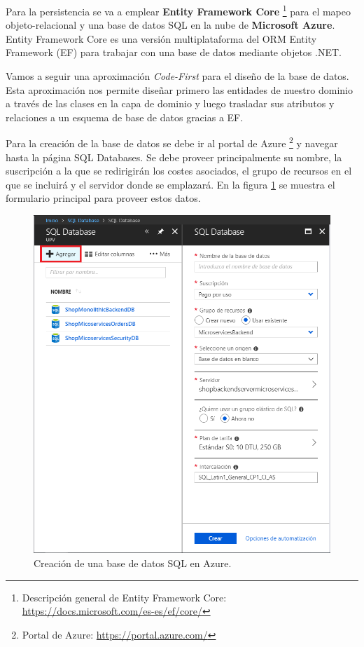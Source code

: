 \documentclass[11pt,spanish,listoffigures]{tfgetsinf}
\begin{document}
Para la persistencia se va a emplear \textbf{Entity Framework Core} \footnote{Descripción general de Entity Framework Core: \url{https://docs.microsoft.com/es-es/ef/core/}} para el mapeo objeto-relacional y una base de datos SQL en la nube de \textbf{Microsoft Azure}. Entity Framework Core es una versión multiplataforma del ORM Entity Framework (EF) para trabajar con una base de datos mediante objetos .NET.

Vamos a seguir una aproximación \textit{Code-First} \cite{CodeFirst} para el diseño de la base de datos. Esta aproximación nos permite diseñar primero las entidades de nuestro dominio a través de las clases en la capa de dominio y luego trasladar sus atributos y relaciones a un esquema de base de datos gracias a EF.

Para la creación de la base de datos se debe ir al portal de Azure \footnote{ Portal de Azure: \url{https://portal.azure.com/}} y navegar hasta la página SQL Databases. Se debe proveer principalmente su nombre, la suscripción a la que se redirigirán los costes asociados, el grupo de recursos en el que se incluirá y el servidor donde se emplazará. En la figura \ref{fig:CreateDB} se muestra el formulario principal para proveer estos datos.

\begin{figure}[h]
\centering
\includegraphics[scale=0.4]{CreateDB}
\caption{Creación de una base de datos SQL en Azure.}
\label{fig:CreateDB}
\end{figure}
\end{document}
